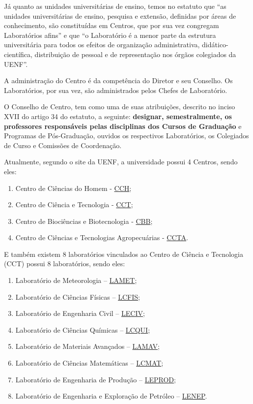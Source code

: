 Já quanto as unidades universitárias de ensino, temos no estatuto que ``as unidades universitárias de ensino, pesquisa e extensão, definidas por áreas de conhecimento, são constituídas em Centros, que por sua vez congregam Laboratórios afins'' e que ``o Laboratório é a menor parte da estrutura universitária para todos os efeitos de organização administrativa, didático-científica, distribuição de pessoal e de representação nos órgãos colegiados da UENF''.

A administração do Centro é da competência do Diretor e seu Conselho. Os Laboratórios, por sua vez, são administrados pelos Chefes de Laboratório.

O Conselho de Centro, tem como uma de suas atribuições, descrito no inciso XVII do artigo 34 do estatuto, a seguinte: \textbf{designar, semestralmente, os professores responsáveis pelas disciplinas dos Cursos de Graduação} e Programas de Pós-Graduação, ouvidos os respectivos Laboratórios, os Colegiados de Curso e Comissões de Coordenação.

Atualmente, segundo o site da UENF, a universidade possui 4 Centros, sendo eles:

\begin{enumerate}
  \item Centro de Ciências do Homem - \href{https://uenf.br/}{CCH};
  \item Centro de Ciência e Tecnologia - \href{https://uenf.br/cct/}{CCT};
  \item Centro de Biociências e Biotecnologia - \href{https://uenf.br/}{CBB};
  \item Centro de Ciências e Tecnologias Agropecuárias - \href{https://uenf.br/}{CCTA}.
\end{enumerate}

E também existem 8 laboratórios vinculados ao Centro de Ciência e Tecnologia (CCT) possui 8 laboratórios, sendo eles:

\begin{enumerate}
  \item Laboratório de Meteorologia – \href{https://uenf.br/cct/administracao/laboratorios/}{LAMET};
  \item Laboratório de Ciências Físicas – \href{https://uenf.br/cct/lcmat/}{LCFIS};
  \item Laboratório de Engenharia Civil – \href{https://uenf.br/cct/administracao/laboratorios/}{LECIV};
  \item Laboratório de Ciências Químicas – \href{https://uenf.br/cct/administracao/laboratorios/}{LCQUI};
  \item Laboratório de Materiais Avançados – \href{https://uenf.br/cct/administracao/laboratorios/}{LAMAV};
  \item Laboratório de Ciências Matemáticas – \href{https://uenf.br/cct/administracao/laboratorios/}{LCMAT};
  \item Laboratório de Engenharia de Produção – \href{https://uenf.br/cct/administracao/laboratorios/}{LEPROD};
  \item Laboratório de Engenharia e Exploração de Petróleo – \href{https://uenf.br/cct/administracao/laboratorios/}{LENEP}.
\end{enumerate}

